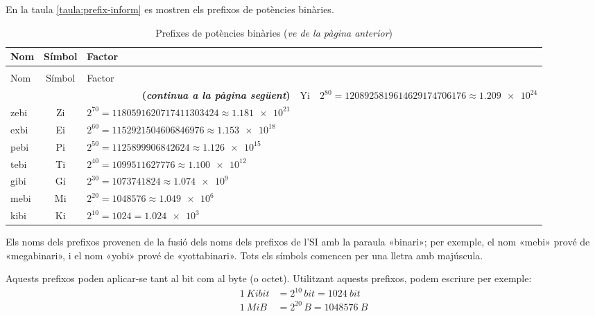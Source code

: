 En la taula \vref{taula:prefix-inform} es mostren els prefixos de potències binàries.
\begin{longtable}[h]{lcl}
   \caption{\label{taula:prefix-inform} Prefixos de potències binàries}\\
   \toprule[1pt]
    Nom & Símbol  & Factor \\
   \midrule
   \endfirsthead
   \caption[]{Prefixes de potències binàries (\emph{ve de la pàgina anterior})}\\
   \toprule[1pt]
    Nom & Símbol  & Factor \\
   \midrule
   \endhead
   \midrule
   \multicolumn{3}{r}{\sffamily\bfseries\color{NavyBlue}(\emph{continua a la pàgina següent})}
   \endfoot
   \endlastfoot
   yobi & Yi   & $2^{80} = \num{1208925819614629174706176}\approx \num{1,209e24}$ \\
   zebi & Zi   & $2^{70} = \num{1180591620717411303424}\approx \num{1,181e21}$ \\
   exbi & Ei   & $2^{60} = \num{1152921504606846976}\approx \num{1,153e18}$ \\
   pebi & Pi   & $2^{50} = \num{1125899906842624}\approx \num{1,126e15}$ \\
   tebi & Ti   & $2^{40} = \num{1099511627776}\approx \num{1,100e12}$ \\
   gibi & Gi   & $2^{30} = \num{1073741824}\approx \num{1,074e9}$  \\
   mebi & Mi   & $2^{20} = \num{1048576} \approx \num{1,049e6}$ \\
   kibi & Ki   & $2^{10} = 1024 =\num{1,024e3}$  \\
   \bottomrule[1pt]
\end{longtable}
        
   

\vspace{-8.5mm}
Els noms dels prefixos provenen de la fusió dels noms dels prefixos de l'SI amb la paraula «binari»; per exemple, el nom «mebi» prové de «megabinari», i el nom «yobi» prové de «yottabinari». Tots els símbols comencen per una lletra amb majúscula. 

Aquests prefixos poden aplicar-se tant al bit com al byte (o octet). Utilitzant aquests prefixos, podem escriure per exemple:
\begin{align*}
	\qty{1}{Kibit} &= 2^{10}\unit{\,bit} = \qty{1024}{bit} \\
	\qty{1}{MiB} &= 2^{20}\unit{\,B} = \qty{1048576}{B}
\end{align*}


